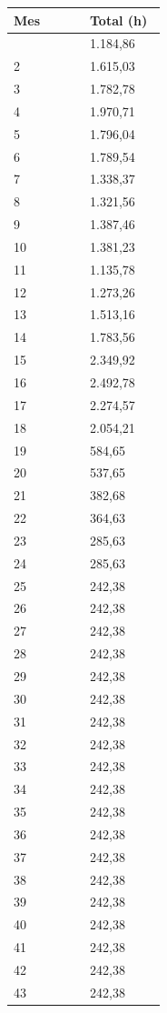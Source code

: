 \begin{longtable}{@{}p{0.465\linewidth}p{0.465\linewidth}@{}}
\toprule
\textbf{Mes} & \textbf{Total (h)} \\
\midrule
\endhead
\bottomrule
\endlastfoot
1 & 1.184,86 \\
2 & 1.615,03 \\
3 & 1.782,78 \\
4 & 1.970,71 \\
5 & 1.796,04 \\
6 & 1.789,54 \\
7 & 1.338,37 \\
8 & 1.321,56 \\
9 & 1.387,46 \\
10 & 1.381,23 \\
11 & 1.135,78 \\
12 & 1.273,26 \\
13 & 1.513,16 \\
14 & 1.783,56 \\
15 & 2.349,92 \\
16 & 2.492,78 \\
17 & 2.274,57 \\
18 & 2.054,21 \\
19 & 584,65 \\
20 & 537,65 \\
21 & 382,68 \\
22 & 364,63 \\
23 & 285,63 \\
24 & 285,63 \\
25 & 242,38 \\
26 & 242,38 \\
27 & 242,38 \\
28 & 242,38 \\
29 & 242,38 \\
30 & 242,38 \\
31 & 242,38 \\
32 & 242,38 \\
33 & 242,38 \\
34 & 242,38 \\
35 & 242,38 \\
36 & 242,38 \\
37 & 242,38 \\
38 & 242,38 \\
39 & 242,38 \\
40 & 242,38 \\
41 & 242,38 \\
42 & 242,38 \\
43 & 242,38 \\

\end{longtable}
